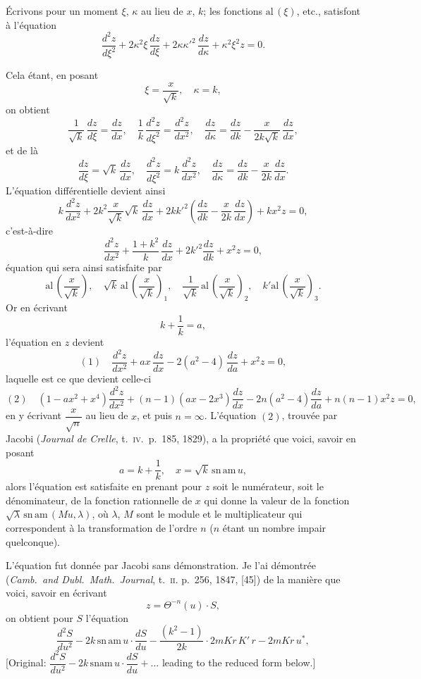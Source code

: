 \documentclass[11pt,a4paper]{article}
\begin{document}
\medskip

\'{E}crivons pour un moment $\xi$, $\kappa$ au lieu de $x$, $k$; les fonctions $\mathrm{al}\,(\xi)$, etc., satisfont \`{a} l'\'{e}quation
\[
\frac{d^2z}{d\xi^2}+2\kappa^2\xi\,\frac{dz}{d\xi}+2\kappa\kappa'^2\,\frac{dz}{d\kappa}+\kappa^2\xi^2 z=0.
\]
\clearpage

\noindent Cela \'{e}tant, en posant
\[
\xi=\frac{x}{\sqrt{k}}, \quad \kappa=k,
\]
on obtient
\[
\frac{1}{\sqrt{k}}\,\frac{dz}{d\xi}=\frac{dz}{dx}, \quad \frac{1}{k}\,\frac{d^2z}{d\xi^2}=\frac{d^2z}{dx^2}, \quad \frac{dz}{d\kappa}=\frac{dz}{dk}-\frac{x}{2k\sqrt{k}}\,\frac{dz}{dx},
\]
et de l\`{a}
\[
\frac{dz}{d\xi}=\sqrt{k}\,\frac{dz}{dx}, \quad \frac{d^2z}{d\xi^2}=k\,\frac{d^2z}{dx^2}, \quad \frac{dz}{d\kappa}=\frac{dz}{dk}-\frac{x}{2k}\,\frac{dz}{dx}.
\]
L'\'{e}quation diff\'{e}rentielle devient ainsi
\[
k\,\frac{d^2z}{dx^2}+2k^2\frac{x}{\sqrt{k}}\sqrt{k}\,\frac{dz}{dx}+2kk'^2\left(\frac{dz}{dk}-\frac{x}{2k}\,\frac{dz}{dx}\right)+kx^2z=0,
\]
c'est-\`{a}-dire
\[
\frac{d^2z}{dx^2}+\frac{1+k^2}{k}\,\frac{dz}{dx}+2k'^2\frac{dz}{dk}+x^2z=0,
\]
\'{e}quation qui sera ainsi satisfaite par
\[
\mathrm{al}\,\left(\frac{x}{\sqrt{k}}\right), \quad \sqrt{k}\,\mathrm{al}\,\left(\frac{x}{\sqrt{k}}\right)_1, \quad \frac{1}{\sqrt{k}}\,\mathrm{al}\,\left(\frac{x}{\sqrt{k}}\right)_2, \quad k'\mathrm{al}\,\left(\frac{x}{\sqrt{k}}\right)_3.
\]
Or en \'{e}crivant
\[
k+\frac{1}{k}=a,
\]
l'\'{e}quation en $z$ devient
\[
(1)\quad \frac{d^2z}{dx^2}+ax\,\frac{dz}{dx}-2(a^2-4)\,\frac{dz}{da}+x^2z=0,
\]
laquelle est ce que devient celle-ci
\[
(2)\quad (1-ax^2+x^4)\frac{d^2z}{dx^2}+(n-1)(ax-2x^3)\frac{dz}{dx}-2n(a^2-4)\frac{dz}{da}+n(n-1)x^2z=0,
\]
en y \'{e}crivant $\dfrac{x}{\sqrt{n}}$ au lieu de $x$, et puis $n=\infty$. L'\'{e}quation $(2)$, trouv\'{e}e par Jacobi (\textit{Journal de Crelle}, t.\ \textsc{iv}.\ p.\ 185, 1829), a la propri\'{e}t\'{e} que voici, savoir en posant
\[
a=k+\frac{1}{k}, \quad x=\sqrt{k}\,\mathrm{sn\,am}\,u,
\]
alors l'\'{e}quation est satisfaite en prenant pour $z$ soit le num\'{e}rateur, soit le d\'{e}nominateur, de la fonction rationnelle de $x$ qui donne la valeur de la fonction $\sqrt{\lambda}\,\mathrm{sn\,am}\,(Mu,\lambda)$, o\`{u} $\lambda$, $M$ sont le module et le multiplicateur qui correspondent \`{a} la transformation de l'ordre $n$ ($n$ \'{e}tant un nombre impair quelconque).
\clearpage

\noindent L'\'{e}quation fut donn\'{e}e par Jacobi sans d\'{e}monstration. Je l'ai d\'{e}montr\'{e}e (\textit{Camb.\ and Dubl.\ Math.\ Journal}, t.\ \textsc{ii}. p.\ 256, 1847, [45]) de la mani\`{e}re que voici, savoir en \'{e}crivant
\[
z=\Theta^{-n}(u)\cdot S,
\]
on obtient pour $S$ l'\'{e}quation
\[
\frac{d^2S}{du^2}-2k\,\mathrm{sn\,am}\,u\cdot\frac{dS}{du}-\frac{(k^2-1)}{2k}\cdot 2mKr\,K'\,r-2mKr\,u^*,
\]
{\small[Original: $\dfrac{d^2S}{du^2}-2k\,\mathrm{snam}\,u\cdot\dfrac{dS}{du}+\ldots$ leading to the reduced form below.]}
\end{document}
